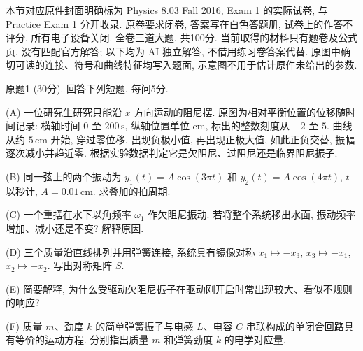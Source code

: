 本节对应原件封面明确标为 Physics 8.03 Fall 2016, Exam 1 的实际试卷, 与 Practice Exam 1 分开收录. 原卷要求闭卷, 答案写在白色答题册, 试卷上的作答不评分, 所有电子设备关闭. 全卷三道大题, 共100分. 当前取得的材料只有题卷及公式页, 没有匹配官方解答; 以下均为 AI 独立解答, 不借用练习卷答案代替. 原图中确切可读的连接、符号和曲线特征均写入题面, 示意图不用于估计原件未给出的参数.

\begin{exercise}\label{exam:actual1.1}
原题1 (30分). 回答下列短题, 每问5分.

(A) 一位研究生研究只能沿 $x$ 方向运动的阻尼摆. 原图为相对平衡位置的位移随时间记录: 横轴时间 $0$ 至 $200\,\mathrm s$, 纵轴位置单位 cm, 标出的整数刻度从 $-2$ 至 $5$. 曲线从约 $5\,\mathrm{cm}$ 开始, 穿过零位移, 出现负极小值, 再出现正极大值, 如此正负交替, 振幅逐次减小并趋近零. 根据实验数据判定它是欠阻尼、过阻尼还是临界阻尼振子.

(B) 同一弦上的两个振动为 $y_1(t)=A\cos(3\pi t)$ 和 $y_2(t)=A\cos(4\pi t)$, $t$ 以秒计, $A=0.01\,\mathrm{cm}$. 求叠加的拍周期.

(C) 一个重摆在水下以角频率 $\omega_1$ 作欠阻尼振动. 若将整个系统移出水面, 振动频率增加、减小还是不变? 解释原因.

(D) 三个质量沿直线排列并用弹簧连接, 系统具有镜像对称 $x_1\mapsto-x_3$, $x_3\mapsto-x_1$, $x_2\mapsto-x_2$. 写出对称矩阵 $S$.

(E) 简要解释, 为什么受驱动欠阻尼振子在驱动刚开启时常出现较大、看似不规则的响应?

(F) 质量 $m$、劲度 $k$ 的简单弹簧振子与电感 $L$、电容 $C$ 串联构成的单闭合回路具有等价的运动方程. 分别指出质量 $m$ 和弹簧劲度 $k$ 的电学对应量.
\end{exercise}
